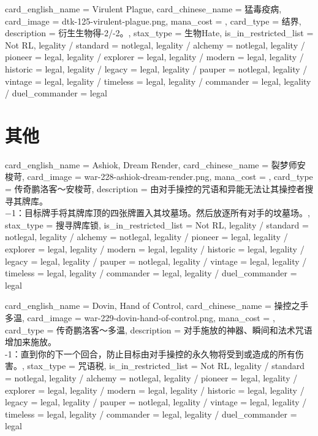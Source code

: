 \documentclass[lang = cn, color = black, 10pt]{AllThatStax}
\begin{document}
\card
{
	card_english_name = {Virulent Plague},
	card_chinese_name = {猛毒疫病},
	card_image = dtk-125-virulent-plague.png,
	mana_cost = ,
	card_type = 结界,
	description = {衍生生物得-2/-2。},
	stax_type = 生物Hate,
	is_in_restricted_list = Not RL,
	legality / standard = notlegal,
	legality / alchemy = notlegal,
	legality / pioneer = legal,
	legality / explorer = legal,
	legality / modern = legal,
	legality / historic = legal,
	legality / legacy = legal,
	legality / pauper = notlegal,
	legality / vintage = legal,
	legality / timeless = legal,
	legality / commander = legal,
	legality / duel_commander = legal
}

\section{其他}

\card
{
	card_english_name = {Ashiok, Dream Render},
	card_chinese_name = {裂梦师安梭苛},
	card_image = war-228-ashiok-dream-render.png,
	mana_cost = ,
	card_type = 传奇鹏洛客～安梭苛,
	description = {由对手操控的咒语和异能无法让其操控者搜寻其牌库。\\
−1：目标牌手将其牌库顶的四张牌置入其坟墓场。然后放逐所有对手的坟墓场。},
	stax_type = 搜寻牌库锁,
	is_in_restricted_list = Not RL,
	legality / standard = notlegal,
	legality / alchemy = notlegal,
	legality / pioneer = legal,
	legality / explorer = legal,
	legality / modern = legal,
	legality / historic = legal,
	legality / legacy = legal,
	legality / pauper = notlegal,
	legality / vintage = legal,
	legality / timeless = legal,
	legality / commander = legal,
	legality / duel_commander = legal
}

\card
{
	card_english_name = {Dovin, Hand of Control},
	card_chinese_name = {操控之手多温},
	card_image = war-229-dovin-hand-of-control.png,
	mana_cost = ,
	card_type = 传奇鹏洛客～多温,
	description = {对手施放的神器、瞬间和法术咒语增加来施放。\\
-1：直到你的下一个回合，防止目标由对手操控的永久物将受到或造成的所有伤害。},
	stax_type = 咒语税,
	is_in_restricted_list = Not RL,
	legality / standard = notlegal,
	legality / alchemy = notlegal,
	legality / pioneer = legal,
	legality / explorer = legal,
	legality / modern = legal,
	legality / historic = legal,
	legality / legacy = legal,
	legality / pauper = notlegal,
	legality / vintage = legal,
	legality / timeless = legal,
	legality / commander = legal,
	legality / duel_commander = legal
}
\end{document}
